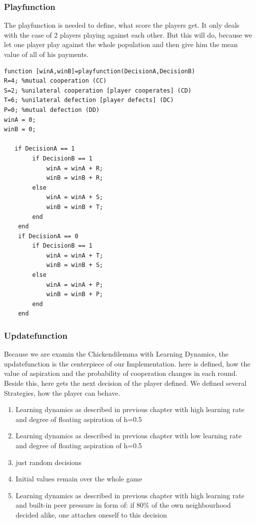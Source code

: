\documentclass[11pt]{article}
\begin{document}
\subsubsection{Playfunction}
The playfunction is needed to define, what score the players get. It only deals with the case of 2 players playing against each other. But this will do, because we let one player play against the whole population and then give him the mean value of all of his payments.

\begin{verbatim}
function [winA,winB]=playfunction(DecisionA,DecisionB)
R=4; %mutual cooperation (CC)
S=2; %unilateral cooperation [player cooperates] (CD)
T=6; %unilateral defection [player defects] (DC)
P=0; %mutual defection (DD)
winA = 0;
winB = 0;

   if DecisionA == 1
        if DecisionB == 1
            winA = winA + R;
            winB = winB + R;
        else 
            winA = winA + S;
            winB = winB + T;
        end
    end
    if DecisionA == 0
        if DecisionB == 1
            winA = winA + T;
            winB = winB + S;
        else 
            winA = winA + P;
            winB = winB + P;
        end
    end
\end{verbatim}

\subsubsection{Updatefunction}

Because we are examin the Chickendilemma with Learning Dynamics, the updatefunction is the centerpiece of our Implementation. here is defined, how the value of aspiration and the probability of cooperation changes in each round. Beside this, here gets the next decision of the player defined. We defined several Strategies, how the player can behave.
\begin{enumerate}
\item Learning dynamics as described in previous chapter with high learning rate and degree of floating aspiration of h=0.5
\item Learning dynamics as described in previous chapter with low learning rate and degree of floating aspiration of h=0.5
\item just random decisions
\item Initial values remain over the whole game
\item  Learning dynamics as described in previous chapter with high learning rate and built-in peer pressure in form of: if 80\% of the own neighbourhood decided alike, one attaches oneself to this decision

\end{enumerate}
\end{document}

